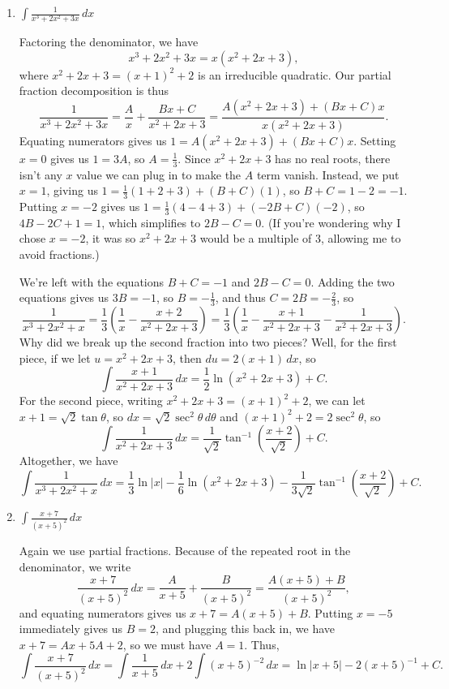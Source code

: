 \documentclass[12pt]{article}
\newcommand{\di}{\displaystyle}
\newcommand{\abs}[1]{\lvert #1\rvert}
\begin{document}
\begin{enumerate}
  \item $\di \int \frac{1}{x^3+2x^2+3x}\,dx$  
 
 \medskip
 
 Factoring the denominator, we have 
\[
 x^3+2x^2+3x = x(x^2+2x+3),
\]
where $x^2+2x+3 = (x+1)^2+2$ is an irreducible quadratic. Our partial fraction decomposition is thus
\[
 \frac{1}{x^3+2x^2+3x} = \frac{A}{x}+\frac{Bx+C}{x^2+2x+3} = \frac{A(x^2+2x+3)+(Bx+C)x}{x(x^2+2x+3)}.
\]
Equating numerators gives us $1 = A(x^2+2x+3)+(Bx+C)x$. Setting $x=0$ gives us $1=3A$, so $A=\frac{1}{3}$. Since $x^2+2x+3$ has no real roots, there isn't any $x$ value we can plug in to make the $A$ term vanish. Instead, we put $x=1$, giving us $1=\frac{1}{3}(1+2+3)+(B+C)(1)$, so $B+C=1-2 = -1$. Putting $x=-2$ gives us $1=\frac{1}{3}(4-4+3)+(-2B+C)(-2)$, so $4B-2C+1=1$, which simplifies to $2B-C=0$. (If you're wondering why I chose $x=-2$, it was so $x^2+2x+3$ would be a multiple of 3, allowing me to avoid fractions.)

We're left with the equations $B+C=-1$ and $2B-C=0$. Adding the two equations gives us $3B=-1$, so $B=-\frac{1}{3}$, and thus $C=2B = -\frac{2}{3}$, so 
\[
 \frac{1}{x^3+2x^2+x} = \frac{1}{3}\left(\frac{1}{x}-\frac{x+2}{x^2+2x+3}\right) = \frac{1}{3}\left(\frac{1}{x}-\frac{x+1}{x^2+2x+3}-\frac{1}{x^2+2x+3}\right).
\]
Why did we break up the second fraction into two pieces? Well, for the first piece, if we let $u=x^2+2x+3$, then $du = 2(x+1)\,dx$, so
\[
 \int \frac{x+1}{x^2+2x+3}\,dx = \frac{1}{2}\ln(x^2+2x+3)+C.
\]
For the second piece, writing $x^2+2x+3 = (x+1)^2+2$, we can let $x+1=\sqrt{2}\tan\theta$, so $dx = \sqrt{2}\sec^2\theta\,d\theta$ and $(x+1)^2+2 = 2\sec^2\theta$, so
\[
 \int\frac{1}{x^2+2x+3}\,dx = \frac{1}{\sqrt{2}}\tan^{-1}\left(\frac{x+2}{\sqrt{2}}\right)+C.
\]
Altogether, we have
\[
 \int\frac{1}{x^3+2x^2+x}\,dx = \frac{1}{3}\ln\abs{x}-\frac{1}{6}\ln(x^2+2x+3)-\frac{1}{3\sqrt{2}}\tan^{-1}\left(\frac{x+2}{\sqrt{2}}\right)+C.
\]

 
   \item $\di \int \frac{x+7}{(x+5)^2}\,dx$

\medskip

Again we use partial fractions. Because of the repeated root in the denominator, we write
\[
 \frac{x+7}{(x+5)^2}\,dx = \frac{A}{x+5}+\frac{B}{(x+5)^2} = \frac{A(x+5)+B}{(x+5)^2},
\]
and equating numerators gives us $x+7 = A(x+5)+B$. Putting $x=-5$ immediately gives us $B=2$, and plugging this back in, we have $x+7 = Ax+5A+2$, so we must have $A=1$. Thus,
\[
 \int\frac{x+7}{(x+5)^2}\,dx = \int\frac{1}{x+5}\,dx+2\int(x+5)^{-2}\,dx = \ln\abs{x+5}-2(x+5)^{-1}+C.
\]
   

\end{enumerate}
\end{document}
